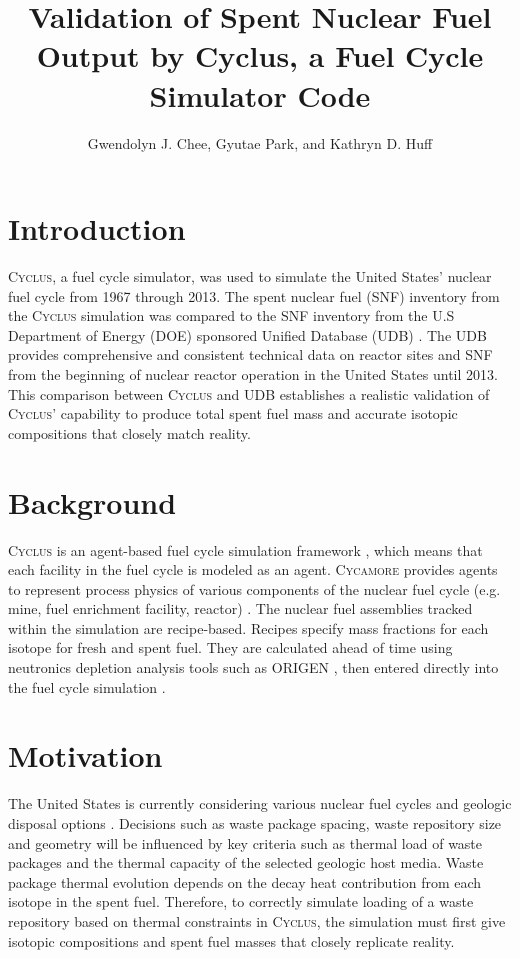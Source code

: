 \documentclass{anstrans}
\title{Validation of Spent Nuclear Fuel Output by Cyclus, a Fuel Cycle Simulator Code}
\author{Gwendolyn J. Chee, Gyutae Park, and Kathryn D. Huff}
\institute{
Dept. of Nuclear, Plasma and Radiological Engineering, University of Illinois at Urbana-Champaign \\
gchee2@illinois.edu
}
\newcommand{\Cyclus}{\textsc{Cyclus}\xspace}%
\newcommand{\Cycamore}{\textsc{Cycamore}\xspace}%
\begin{document}
\section{Introduction}
\Cyclus \cite{carlsen_cyclus_2014}, a fuel cycle simulator, was used to simulate the
United States' nuclear fuel cycle from 1967 through 2013. The spent nuclear fuel (SNF) inventory from the \Cyclus simulation was compared to the SNF inventory from the U.S Department of Energy (DOE) sponsored Unified Database (UDB) \cite{peterson_unf-st&dards_2017}. The UDB provides comprehensive and consistent technical data on reactor sites and SNF from the beginning of nuclear reactor operation in the United States until 2013. This comparison between \Cyclus and UDB establishes a realistic validation of \Cyclus' capability to produce total spent fuel mass and accurate isotopic compositions that closely match reality.

\section{Background}
\Cyclus is an agent-based fuel cycle simulation framework \cite{huff_fundamental_2016}, which means that each facility in the fuel cycle is modeled as an agent. \Cycamore \cite{carlsen_cycamore_2014} provides agents to represent process physics of various components of the nuclear fuel cycle (e.g. mine, fuel enrichment facility, reactor) \cite{huff_extensions_2014}. The nuclear fuel assemblies tracked within the simulation are recipe-based. Recipes specify mass fractions for each isotope for fresh and spent fuel. They are calculated ahead of time using neutronics depletion analysis tools such as ORIGEN \cite{bell_origen_1973}, then entered directly into the fuel cycle simulation \cite{peterson_additional_2017}. 

\section{Motivation}
The United States is currently considering various nuclear fuel cycles and geologic disposal options \cite{DOE_strategy_2013}. Decisions such as waste package spacing, waste repository size and geometry will be influenced by key criteria such as thermal load of waste packages and the thermal capacity of the selected geologic host media. Waste package thermal evolution depends on the decay heat contribution from each isotope in the spent fuel. Therefore, to correctly simulate loading of a waste repository based on thermal constraints in \Cyclus, the simulation must first give isotopic compositions and spent fuel masses that closely replicate reality. 
\end{document}
